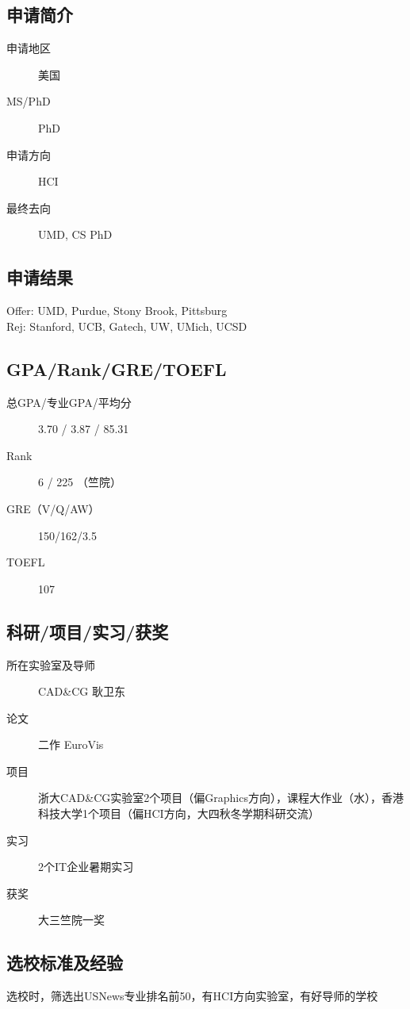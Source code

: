 \documentclass[11pt,fleqn,openany]{book} %
\begin{document}
\noindent\begin{minipage}[t]{0.45\textwidth}
\subsection*{申请简介}
\begin{description}
\item[申请地区] 美国
\item[MS/PhD] PhD
\item[申请方向] HCI
\item[最终去向] UMD, CS PhD
\end{description}
\end{minipage}
\hfill
\begin{minipage}[t]{0.45\textwidth}
\subsection*{申请结果}
\noindent Offer: UMD, Purdue, Stony Brook, Pittsburg\\
Rej: Stanford, UCB, Gatech, UW, UMich, UCSD
\end{minipage}
\subsection*{GPA/Rank/GRE/TOEFL}
\begin{description}
\item[总GPA/专业GPA/平均分] 3.70 / 3.87 / 85.31
\item[Rank] 6 / 225 （竺院）
\item[GRE（V/Q/AW）] 150/162/3.5
\item[TOEFL] 107
\end{description}

\subsection*{科研/项目/实习/获奖}
\begin{description}
\item[所在实验室及导师] CAD\&CG 耿卫东
\item[论文] 二作 EuroVis
\item[项目] 浙大CAD\&CG实验室2个项目（偏Graphics方向），课程大作业（水），香港科技大学1个项目（偏HCI方向，大四秋冬学期科研交流）
\item[实习] 2个IT企业暑期实习
\item[获奖] 大三竺院一奖
\end{description}
\subsection*{选校标准及经验}
选校时，筛选出USNews专业排名前50，有HCI方向实验室，有好导师的学校
\end{document}
